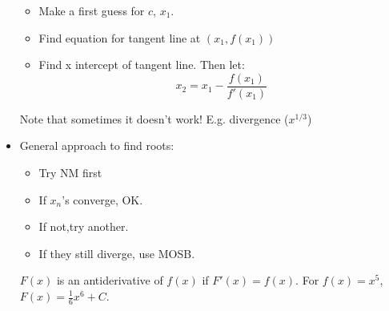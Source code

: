 \begin{itemize}
\begin{itemize}
        \item Make a first guess for $c$, $x_1$.
        \item Find equation for tangent line at $(x_1,f(x_1))$
        \item Find x intercept of tangent line. Then let:
        \begin{equation}
            x_2=x_1-\frac{f(x_1)}{f'(x_1)}
            \label{eq:}
        \end{equation}
    \end{itemize}
    \begin{warning}
        Note that sometimes it doesn't work! E.g. divergence ($x^{1/3}$)
    \end{warning}
    \item General approach to find roots:
    \begin{itemize}
        \item Try NM first
        \item If $x_n$'s converge, OK.
        \item If not,try another.
        \item If they still diverge, use MOSB.
    \end{itemize}
    \begin{definition}
        $F(x)$ is an antiderivative of $f(x)$ if $F'(x)=f(x)$. For $f(x)=x^5$, $F(x)=\frac{1}{6}x^6+C$.
    \end{definition}
\end{itemize}